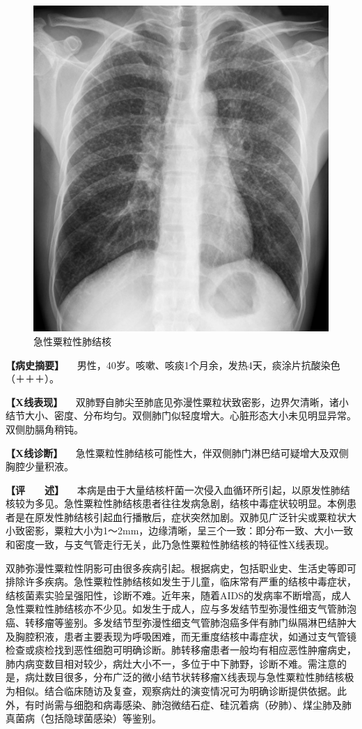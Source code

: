 \begin{figure}[!htbp]
 \centering
 \includegraphics{./images/Image00160.jpg}
 \captionsetup{justification=centering}
 \caption{急性粟粒性肺结核}
 \label{fig3-5-8}
  \end{figure} 

\textbf{【病史摘要】}
　男性，40岁。咳嗽、咳痰1个月余，发热4天，痰涂片抗酸染色（＋＋＋）。

\textbf{【X线表现】}
　双肺野自肺尖至肺底见弥漫性粟粒状致密影，边界欠清晰，诸小结节大小、密度、分布均匀。双侧肺门似轻度增大。心脏形态大小未见明显异常。双侧肋膈角稍钝。

\textbf{【X线诊断】}
　急性粟粒性肺结核可能性大，伴双侧肺门淋巴结可疑增大及双侧胸腔少量积液。

\textbf{【评　　述】}
　本病是由于大量结核杆菌一次侵入血循环所引起，以原发性肺结核较为多见。急性粟粒性肺结核患者往往发病急剧，结核中毒症状较明显。本例患者是在原发性肺结核引起血行播散后，症状突然加剧。双肺见广泛针尖或粟粒状大小致密影，粟粒大小为1～2mm，边缘清晰，呈三个一致：即分布一致、大小一致和密度一致，与支气管走行无关，此乃急性粟粒性肺结核的特征性X线表现。

双肺弥漫性粟粒性阴影可由很多疾病引起。根据病史，包括职业史、生活史等即可排除许多疾病。急性粟粒性肺结核如发生于儿童，临床常有严重的结核中毒症状，结核菌素实验呈强阳性，诊断不难。近年来，随着AIDS的发病率不断增高，成人急性粟粒性肺结核亦不少见。如发生于成人，应与多发结节型弥漫性细支气管肺泡癌、转移瘤等鉴别。多发结节型弥漫性细支气管肺泡癌多伴有肺门纵隔淋巴结肿大及胸腔积液，患者主要表现为呼吸困难，而无重度结核中毒症状，如通过支气管镜检查或痰检找到恶性细胞可明确诊断。肺转移瘤患者一般均有相应恶性肿瘤病史，肺内病变数目相对较少，病灶大小不一，多位于中下肺野，诊断不难。需注意的是，病灶数目很多，分布广泛的微小结节状转移瘤X线表现与急性粟粒性肺结核极为相似。结合临床随访及复查，观察病灶的演变情况可为明确诊断提供依据。此外，有时尚需与细胞和病毒感染、肺泡微结石症、硅沉着病（矽肺）、煤尘肺及肺真菌病（包括隐球菌感染）等鉴别。

